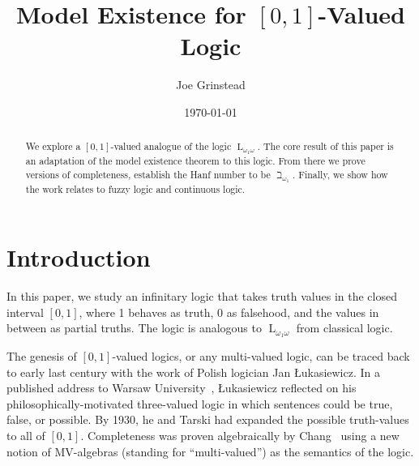 \documentclass{amsart}
\theoremstyle{definition}
\numberwithin{equation}{theorem}
\newcommand{\baselang}{\operatorname{L}}
\newcommand{\lang}{\baselang_{\omega_1\omega}}
\newcommand{\luk}{{\L}ukasiewicz}
\begin{document}
\title{Model Existence for $[0,1]$-Valued Logic}

\author{Joe Grinstead}

\address{Department of Mathematics, CMU}




\date{\today}



\begin{abstract}
	We explore a $[0,1]$-valued analogue of the logic $\lang$.
	The core result of this paper is an adaptation of the model existence theorem to this logic.
	From there we prove versions of completeness, establish the Hanf number to be $\beth_{\omega_1}$.
	Finally, we show how the work relates to fuzzy logic and continuous logic.
\end{abstract}

\maketitle
\tableofcontents
\newpage

\section*{Introduction}
In this paper, we study an infinitary logic that takes truth values in the closed interval $[0,1]$, where 1 behaves as truth, 0 as falsehood, and the values in between as partial truths.
The logic is analogous to $\lang$ from classical logic.

The genesis of $[0,1]$-valued logics, or any multi-valued logic, can be traced back to early last century with the work of Polish logician Jan {\luk}.
In a published address to Warsaw University~\cite{lukasiewicz1918farewell}, {\luk} reflected on his philosophically-motivated three-valued logic in which sentences could be true, false, or possible.
By 1930, he and Tarski had expanded the possible truth-values to all of $[0,1]$.
Completeness was proven algebraically by Chang~\cite{chang1958algebraic,chang1959new} using a new notion of MV-algebras (standing for ``multi-valued'') as the semantics of the logic.
\end{document}
